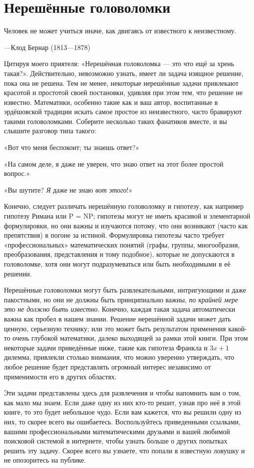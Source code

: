 \chapter*{Нерешённые головоломки}

\epigraph{Человек не может учиться иначе, как двигаясь от известного к неизвестному.}{---Клод Бернар (1813---1878)}

Цитируя моего приятеля: «Нерешённая головоломка --- это что ещё за хрень такая?».
Действительно, невозможно узнать, имеет ли задача изящное решение, пока она не решена.
Тем не менее, некоторые нерешённые задачи привлекают красотой и простотой своей постановки, удивляя при этом тем, что решение не известно.
Математики, особенно такие как и ваш автор, воспитанные в эрдёшовской традиции искать самое простое из неизвестного, часто бравируют такими головоломками.
Соберите несколько таких фанатиков вместе, и вы слышите разговор типа такого:

«Вот что меня беспокоит; ты знаешь ответ?»

«На самом деле, я даже не уверен, что знаю ответ на этот более простой вопрос.»

«Вы шутите? \emph{Я} даже не знаю \emph{вот этого}!»

Конечно, следует различать нерешённую головоломку и гипотезу, как например гипотезу Римана или P = NP;
гипотезы могут не иметь красивой и элементарной формулировки, но они важны и изучаются потому, что они возникают (часто как препятствия) в погоне за истиной.
Формулировка гипотезы часто требует «профессиональных» математических понятий (графы, группы, многообразия, преобразования, представления и тому подобное), которые не допускаются в головоломке, хотя они могут подразумеваться или быть необходимыми в её решении.

Нерешённые головоломки могут быть развлекательными, интригующими и даже пакостными,
но они не должны быть принципиально важны, \emph{по крайней мере это не должно быть известно}.
Конечно, каждая такая задача автоматически важна как пробел в нашем знании.
Решение нерешённой задачи может дать ценную, серьезную технику; или это может быть результатом применения какой-то очень глубокой математики, далеко выходящей за рамки этой книги.
При этом некоторые задачи приведённые ниже, такие как гипотеза Франкла и $3x+1$ дилемма, привлекли столько внимания, что можно уверенно утверждать, что любое решение будет представлять огромный интерес независимо от применимости его в других областях.

Эти задачи представлены здесь для развлечения и чтобы напомнить вам о том, как мало мы знаем.
Если даже одну из них кто-то решит, узнав про неё в этой книге, то это будет небольшое чудо.
Если вам кажется, что вы решили одну из них, то скорее всего вы ошибаетесь.
Воспользуйтесь приведенными ссылками, вашими профессиональными математическими друзьями и вашей любимой поисковой системой в интернете, чтобы узнать больше о других попытках решить эту задачу.
Скорее всего вы узнаете, что попали в известную ловушку и не опозоритесь на публике.

